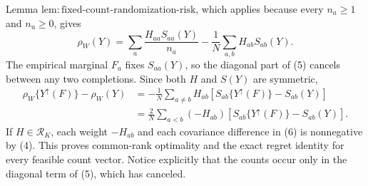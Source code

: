 Lemma \(\mathrm{lem{:}fixed\text{-}count\text{-}randomization\text{-}risk}\), which applies because every \(n_a\geq1\) and \(n_{\mathrm u}\geq0\), gives
\[
\rho_W(Y)=\sum_a\frac{H_{aa}S_{aa}(Y)}{n_a}
-\frac1N\sum_{a,b}H_{ab}S_{ab}(Y). \tag{5}
\]
The empirical marginal \(F_a\) fixes \(S_{aa}(Y)\), so the diagonal part of (5) cancels between any two completions.  Since both \(H\) and \(S(Y)\) are symmetric,
\[
\begin{aligned}
\rho_W\{Y^{\uparrow}(F)\}-\rho_W(Y)
&=-\frac1N\sum_{a\ne b}H_{ab}
\left[S_{ab}\{Y^{\uparrow}(F)\}-S_{ab}(Y)\right]\\
&=\frac2N\sum_{a<b}(-H_{ab})
\left[S_{ab}\{Y^{\uparrow}(F)\}-S_{ab}(Y)\right]. \tag{6}
\end{aligned}
\]
If \(H\in\mathcal R_K\), each weight \(-H_{ab}\) and each covariance difference in (6) is nonnegative by (4).  This proves common-rank optimality and the exact regret identity for every feasible count vector.  Notice explicitly that the counts occur only in the diagonal term of (5), which has canceled.


